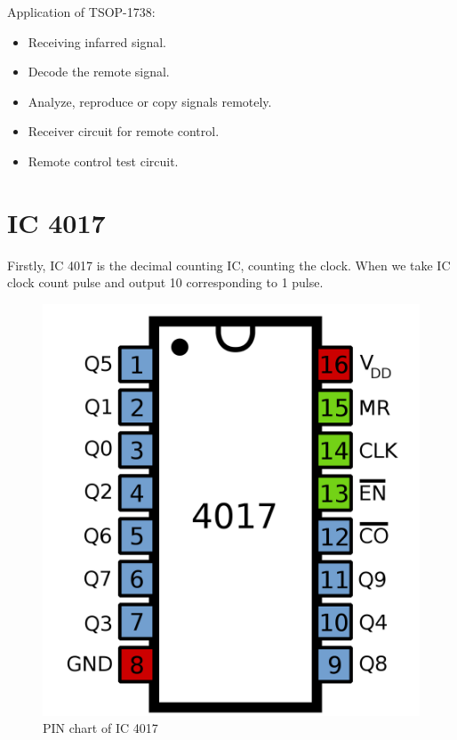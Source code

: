 \documentclass[a4paper]{report}
\begin{document}
        \par Application of TSOP-1738:
        \linebreak
        \begin{itemize}
            \item Receiving infarred signal.
            \item Decode the remote signal.
            \item Analyze, reproduce or copy signals remotely.
            \item Receiver circuit for remote control.
            \item Remote control test circuit.
        \end{itemize}
    \section{IC 4017}
        Firstly, IC 4017 is the decimal counting IC, counting the clock. When we take IC clock count 
        pulse and output 10 corresponding to 1 pulse.
        \begin{figure}[ht]
            \centering
            \includegraphics[width=0.5\linewidth]{4017.png}
            \caption{\label{fig:boat1}PIN chart of IC 4017}
        \end{figure}
\end{document}
